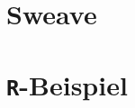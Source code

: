 \documentclass[twoside]{scrartcl}
\providecommand{\R}{\texttt{R}}
\begin{document}
\section{Sweave\label{app:sweave}}

\pagebreak
\section{\R{}-Beispiel\label{app:write_readme}}

%
\end{document}
